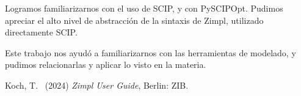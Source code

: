 \documentclass[11pt, a4paper, pdftex]{article}
\begin{document}
Logramos familiarizarnos con el uso de SCIP, y con PySCIPOpt.
Pudimos apreciar el alto nivel de abstracción de la sintaxis de Zimpl, utilizado directamente SCIP.

Este trabajo nos ayudó a familiarizarnos con las herramientas de modelado, y
pudimos relacionarlas y aplicar lo visto en la materia.

\begin{thebibliography}{99}
	Koch, T.\
	(2024)
	\emph{Zimpl User Guide},
	Berlin: ZIB.
\end{thebibliography}
\end{document}
